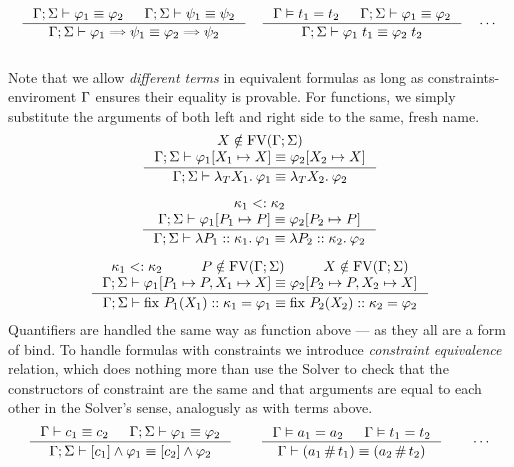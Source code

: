 \documentclass[english, mgr]{iithesis}
\renewcommand{\it}[1]{\textit{#1}}
\newcommand{\fix}[3]{\ensuremath{\text{fix }#1(#2)\ofkind#3=}}\newcommand{\myatop}[2]{\ensuremath{\genfrac{}{}{0pt}{}{#1\hfill}{#2\hfill}}}
\begin{document}
\\
$$
  \inference{
    \jgmnt[\Gamma; \Sigma]{\formphi_1 \equiv \formphi_2 } &
    \jgmnt[\Gamma; \Sigma]{\psi_1 \equiv \psi_2 }
    }{
    \jgmnt[\Gamma; \Sigma]{\formphi_1 \fImp \psi_1 \equiv \formphi_2 \fImp \psi_2 }
  }
  \quad
  \inference{
    \cjgmnt[\Gamma]{\term_1 \ceq \term_2} &
    \jgmnt[\Gamma; \Sigma]{\formphi_1 \equiv \formphi_2 }
    }{
    \jgmnt[\Gamma; \Sigma]{\formphi_1 \fAppTerm \term_1 \equiv \formphi_2 \fAppTerm \term_2 }
  }
  \quad
  \cdots
$$
\\
Note that we allow \it{different terms} in equivalent formulas as long as
constraints-enviroment $\Gamma$ ensures their equality is provable.
For functions, we simply substitute the arguments of both left and right side
to the same, fresh name.
\\
$$
  \inference{
    \termv \notin \fv[\Gamma; \Sigma] \\
    \jgmnt[\Gamma; \Sigma]{\formphi_1[\termv_1 \mapsto \termv] \equiv \formphi_2[\termv_2 \mapsto \termv] }
    }{
    \jgmnt[\Gamma; \Sigma]{\fLamTerm{\termv_1}\formphi_1 \equiv \fLamTerm{\termv_2}\formphi_2 }
  }
$$

$$
  \inference{
    \kind_1 \subkind \kind_2 \\
    \jgmnt[\Gamma; \Sigma]{\formphi_1[P_1 \mapsto P] \equiv \formphi_2[P_2 \mapsto P] }
    }{
    \jgmnt[\Gamma; \Sigma]{\fLamForm{P_1}{\kind_1}{\formphi_1} \equiv \fLamForm{P_2}{\kind_2}{\formphi_2}}
  }
$$

$$
  \inference{
    \kind_1 \subkind \kind_2 &
    P \notin \fv[\Gamma; \Sigma] & \termv \notin \fv[\Gamma; \Sigma] \\
    \jgmnt[\Gamma; \Sigma]{\formphi_1[P_1 \mapsto P, \termv_1 \mapsto \termv] \equiv \formphi_2[P_2 \mapsto P, \termv_2 \mapsto \termv] }
    }{
    \jgmnt[\Gamma; \Sigma]{\fix{P_1}{\termv_1}{\kind_1}\formphi_1 \equiv \fix{P_2}{\termv_2}{\kind_2}\formphi_2}
  }
$$
Quantifiers are handled the same way as function above --- as they all are a form of bind.
To handle formulas with constraints we introduce \it{constraint equivalence} relation,
which does nothing more than use the Solver to check that the constructors
of constraint are the same and that arguments are equal to each other in the Solver's sense,
analogusly as with terms above.
\\
$$
  \inference{
    \jgmnt[\Gamma]{\constr_1 \equiv \constr_2 } &
    \jgmnt[\Gamma; \Sigma]{\formphi_1 \equiv \formphi_2 }
  }{
    \jgmnt[\Gamma; \Sigma]{\fCAnd{\constr_1}\formphi_1 \equiv \fCAnd{\constr_2}\formphi_2 }
  }
\qquad
  \inference{
    \cjgmnt[\Gamma]{\atomv_1 \ceq \atomv_2 } & \cjgmnt[\Gamma]{\term_1 \ceq \term_2 }
  }{
    \jgmnt[\Gamma]{(\atomv_1 \cfresh \term_1) \equiv (\atomv_2 \cfresh \term_2) }
  }
\qquad
\cdots
$$
\end{document}
